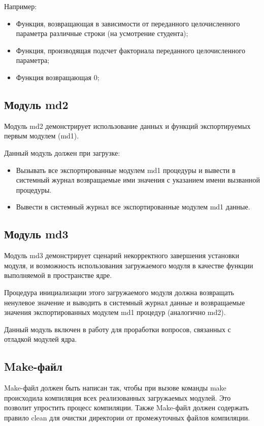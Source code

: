 \documentclass[a4paper,12pt]{article}
\begin{document}
	Например:
	\begin{itemize}
		\item Функция, возвращающая в зависимости от переданного целочисленного параметра различные строки (на усмотрение студента);
		\item Функция, производящая подсчет факториала переданного целочисленного параметра;
		\item Функция возвращающая 0; 
	\end{itemize}
	
	
	\subsection*{Модуль md2}
	
	Модуль md2 демонстрирует использование данных и функций экспортируемых первым модулем (md1).
	
	Данный модуль должен при загрузке:
	\begin{itemize}
		\item Вызывать все экспортированные модулем md1 процедуры и вывести в системный журнал возвращаемые ими значения с указанием имени вызванной процедуры.
		\item Вывести в системный журнал все экспортированные модулем md1 данные.
	\end{itemize}
	
	
	\subsection*{Модуль md3}
	
	Модуль md3 демонстрирует сценарий некорректного завершения установки модуля, и возможность использования загружаемого модуля в качестве функции выполняемой в пространстве ядре.  
	
	Процедура инициализации этого загружаемого модуля должна возвращать ненулевое значение и выводить в системный журнал данные и возвращаемые значения экспортированных модулем md1 процедур (аналогично md2).
	
	Данный модуль включен в работу для проработки вопросов, связанных с отладкой модулей ядра. 
	
	\subsection*{Make-файл}
	
	Make-файл должен быть написан так, чтобы при вызове команды make происходила компиляция всех реализованных загружаемых модулей. Это позволит упростить процесс компиляции. Также Make-файл должен содержать правило clean для очистки директории от промежуточных файлов компиляции. 
	
\end{document}
